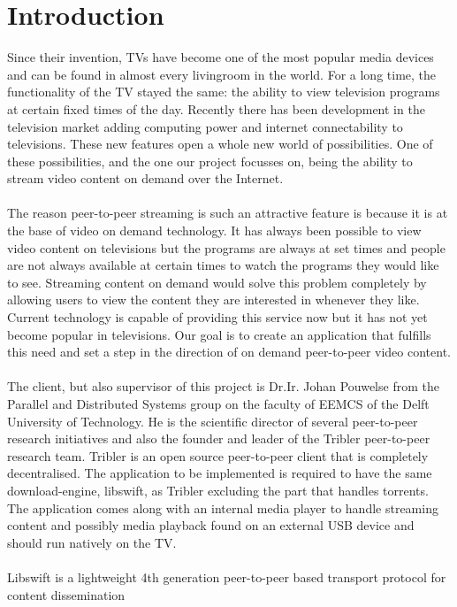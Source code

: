 \chapter{Introduction}
Since their invention, TV\textquotesingle s have become one of the most popular media devices and can be found in almost every livingroom in the world. For a long time, the functionality of the TV stayed the same: the ability to view television programs at certain fixed times of the day. Recently there has been development in the television market adding computing power and internet connectability to televisions. These new features open a whole new world of possibilities. One of these possibilities, and the one our project focusses on, being the ability to stream video content on demand over the Internet.
\\\\
The reason peer-to-peer streaming is such an attractive feature is because it is at the base of video on demand technology. It has always been possible to view video content on televisions but the programs are always at set times and people are not always available at certain times to watch the programs they would like to see. Streaming content on demand would solve this problem completely by allowing users to view the content they are interested in whenever they like. Current technology is capable of providing this service now but it has not yet become popular in televisions. Our goal is to create an application that fulfills this need and set a step in the direction of on demand peer-to-peer video content.
\\\\
The client, but also supervisor of this project is Dr.Ir. Johan Pouwelse from the Parallel and Distributed Systems group on the faculty of EEMCS of the Delft University of Technology.
He is the scientific director of several peer-to-peer research initiatives and also the founder and leader of the Tribler\cite{tribler} peer-to-peer research team.
Tribler is an open source peer-to-peer client that is completely decentralised.
The application to be implemented is required to have the same download-engine, libswift,\cite{swift} as Tribler excluding the part that handles torrents.
The application comes along with an internal media player to handle streaming content and possibly media playback found on an external USB device and should run natively on the TV.
\\\\
Libswift is a lightweight 4th generation peer-to-peer based transport protocol for content dissemination
